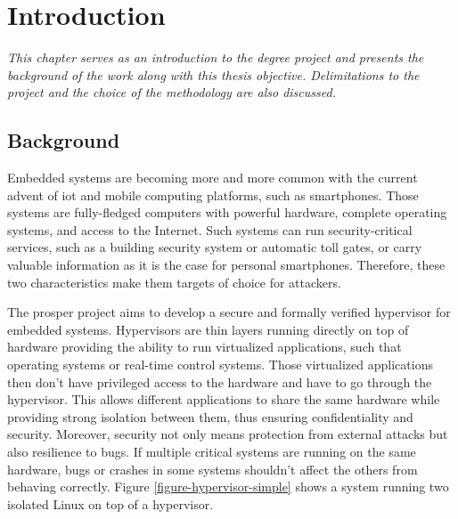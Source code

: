 \documentclass{kththesis}
\begin{document}
\begingroup
\hypersetup{linkcolor=black}
\tableofcontents
\endgroup

\printglossaries

\mainmatter %

\chapter{Introduction}
\vspace{-1cm}
\textit{This chapter serves as an introduction to the degree project and presents the background of the work along with this thesis objective. Delimitations to the project and the choice of the methodology are also discussed.}

\section{Background}

Embedded systems are becoming more and more common with the current advent of \gls{iot} \footnotemark and mobile computing platforms, such as smartphones. Those systems are fully-fledged computers with powerful hardware, complete operating systems, and access to the Internet. Such systems can run security-critical services, such as a building security system or automatic toll gates, or carry valuable information as it is the case for personal smartphones. Therefore, these two characteristics make them targets of choice for attackers.


The \gls{prosper} project \cite{noauthor_prosper:_nodate} aims to develop a secure and formally verified hypervisor for embedded systems. Hypervisors are thin layers running directly on top of hardware providing the ability to run virtualized applications, such that operating systems or real-time control systems. Those virtualized applications then don't have privileged access to the hardware and have to go through the hypervisor. This allows different applications to share the same hardware while providing strong isolation between them, thus ensuring confidentiality and security. Moreover, security not only means protection from external attacks but also resilience to bugs. If multiple critical systems are running on the same hardware, bugs or crashes in some systems shouldn't affect the others from behaving correctly. Figure \ref{figure-hypervisor-simple} shows a system running two isolated Linux on top of a hypervisor.
\end{document}
